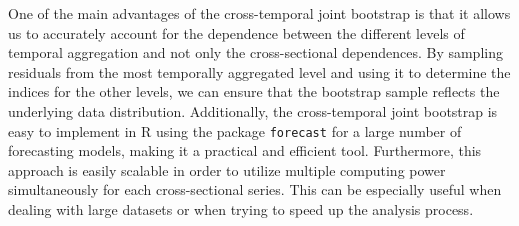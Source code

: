 \documentclass[a4paper,11pt]{article}
\theoremstyle{definition}
\begin{document}
One of the main advantages of the cross-temporal joint bootstrap is that it allows us to accurately account for the dependence between the different levels of temporal aggregation and not only the cross-sectional dependences. By sampling residuals from the most temporally aggregated level and using it to determine the indices for the other levels, we can ensure that the bootstrap sample reflects the underlying data distribution. Additionally, the cross-temporal joint bootstrap is easy to implement in \textsf{R} \citep{rcoreteam2022} using the package \texttt{forecast} \citep{hyndman2022} for a large number of forecasting models, making it a practical and efficient tool. Furthermore, this approach is easily scalable in order to utilize multiple computing power simultaneously for each cross-sectional series. This can be especially useful when dealing with large datasets or when trying to speed up the analysis process.
\end{document}
